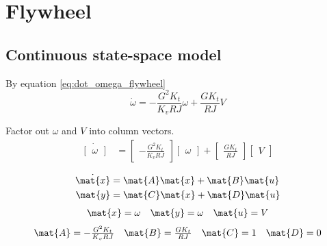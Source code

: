 \section{Flywheel}
\label{sec:ss_model_flywheel}

\subsection{Continuous state-space model}

By equation \eqref{eq:dot_omega_flywheel}
\begin{equation*}
  \dot{\omega} = -\frac{G^2 K_t}{K_v RJ} \omega + \frac{G K_t}{RJ} V
\end{equation*}

Factor out $\omega$ and $V$ into column vectors.
\begin{align*}
  \dot{\begin{bmatrix}
    \omega
  \end{bmatrix}} &=
  \begin{bmatrix}
    -\frac{G^2 K_t}{K_v RJ}
  \end{bmatrix}
  \begin{bmatrix}
    \omega
  \end{bmatrix} +
  \begin{bmatrix}
    \frac{GK_t}{RJ}
  \end{bmatrix}
  \begin{bmatrix}
    V
  \end{bmatrix}
\end{align*}
\begin{theorem}
  \begin{align*}
    \dot{\mat{x}} &= \mat{A} \mat{x} + \mat{B} \mat{u} \\
    \mat{y} &= \mat{C} \mat{x} + \mat{D} \mat{u}
  \end{align*}
  \begin{equation*}
    \begin{array}{ccc}
      \mat{x} = \omega &
      \mat{y} = \omega &
      \mat{u} = V
    \end{array}
  \end{equation*}
  \begin{equation}
    \begin{array}{cccc}
      \mat{A} = -\frac{G^2 K_t}{K_v RJ} &
      \mat{B} = \frac{G K_t}{RJ} &
      \mat{C} = 1 &
      \mat{D} = 0
    \end{array}
  \end{equation}
\end{theorem}

